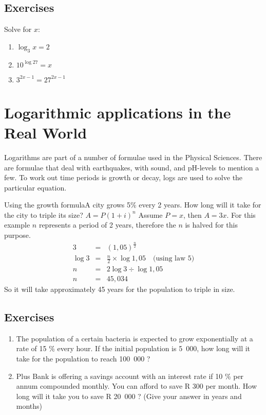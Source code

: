 \subsection{Exercises}
Solve for $x$:
\begin{enumerate}
\item{$\log_{3}x = 2$}
\item{$10^{\log 27} = x$}
\item{$3^{2x-1}=27^{2x-1}$}
\end{enumerate}



\section{Logarithmic applications in the Real World}

Logarithms are part of a number of formulae used in the Physical Sciences.  There are formulae that deal with earthquakes, with sound, and pH-levels to mention a few.  To work out time periods is growth or decay, logs are used to solve the particular equation.

\begin{wex}{Using the growth formula}{A city grows 5\% every 2 years. How long will it take for the city to triple its size?}{
$A = P(1 + i)^n$
Assume $P = x$, then $A = 3x$.
For this example $n$ represents a period of 2 years, therefore the $n$ is halved for this purpose.
\begin{eqnarray*}
3 &=& (1,05)^{\frac{n}{2}}\\
\log{3} &=& \frac{n}{2} \times {\log{1,05}}\quad \mbox{(using law 5)}\\
n &=& 2 \log{3} \div {\log{1,05}}\\
n &=& 45,034
\end{eqnarray*}
So it will take approximately 45 years for the population to triple in size.
}
\end{wex}

\subsection{Exercises}
\begin{enumerate}
\item{The population of a certain bacteria is expected to grow exponentially at a rate of 15 \% every hour.  If the initial population is 5~000, how long will it take for the population to reach 100~000 ?}
\item{Plus Bank is offering a savings account with an interest rate if 10 \% per annum compounded monthly.  You can afford to save R 300 per month.  How long will it take you to save R 20~000 ?  (Give your answer in years and months)}
\end{enumerate}

